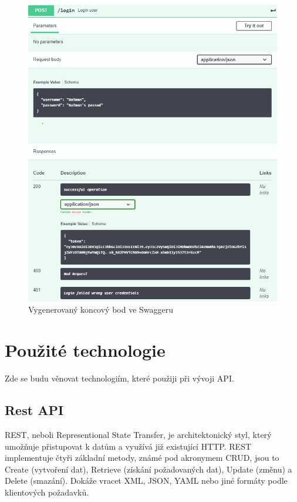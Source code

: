 \documentclass[thesis=B,czech]{FITthesis}[2012/06/26]
\begin{document}
        \begin{figure}[h!] \label{SwaggerGenerated}
            \includegraphics[width=\linewidth]{Swagger_generated_example}
            \caption{Vygenerovaný koncový bod ve Swaggeru}
        \end{figure} 

    \section{Použité technologie}
     Zde se budu věnovat technologiím, které použiji při vývoji API.
        \subsection{Rest API}
        REST, neboli Representional State Transfer, je architektonický styl, který umožňuje přistupovat k datům a využívá již existující HTTP. REST implementuje čtyři základní metody, známé pod akronymem CRUD, jsou to
        Create (vytvoření dat), Retrieve (získání požadovaných dat), Update (změnu) a Delete (smazání). Dokáže vracet XML, JSON, YAML nebo jiné formáty podle klientových požadavků. \cite{rest}
        
\end{document}
